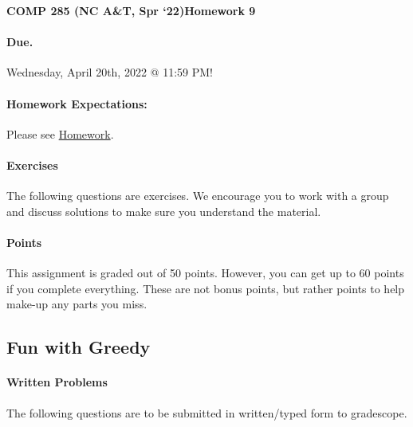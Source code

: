 \documentclass [12pt]{article}
\begin{document}
 

{\LARGE \textbf{COMP 285 (NC A\&T, Spr `22)}\hfill \textbf{Homework 9} } 
\vspace{1em} 
\begin{Instruction} 

\paragraph{Due.} Wednesday, April 20th, 2022 @ 11:59 PM!
\end{Instruction} 

\vspace{1em} 
\begin{Instruction} \paragraph{Homework Expectations:} Please see \href{https://www.comp285.ml/homework/#general-homework-information}{Homework}.
\end{Instruction}

\vspace{1em} 
\begin{Instruction} 

\paragraph{Exercises} The following questions are exercises. We encourage you to work with a group and discuss solutions to make sure you understand the material.

\paragraph{Points} This assignment is graded out of 50 points. However, you can get up to 60 points if you complete everything. These are not bonus points, but rather points to help make-up any parts you miss.

\end{Instruction} 

\begin{centering}
\section*{Fun with Greedy}
\end{centering}

\begin{Instruction}

\paragraph{Written Problems} The following questions are to be submitted in written/typed form to gradescope.

\end{Instruction}
\end{document}
